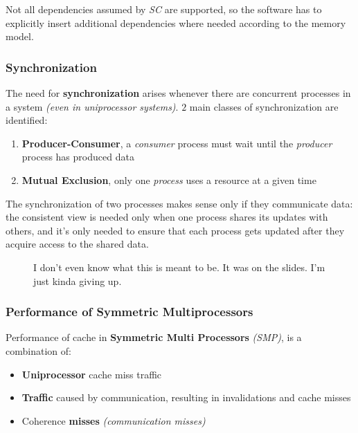 \documentclass[english]{article}
\begin{document}
\bigskip
Not all dependencies assumed by \textit{SC} are supported, so the software has to explicitly insert additional dependencies where needed according to the memory model.

\subsubsection{Synchronization}

The need for \textbf{synchronization} arises whenever there are concurrent processes in a system \textit{(even in uniprocessor systems)}.
\(2\) main classes of synchronization are identified:

\begin{enumerate}
  \item \textbf{Producer-Consumer}, a \textit{consumer} process must wait until the \textit{producer} process has produced data
  \item \textbf{Mutual Exclusion}, only one \textit{process} uses a resource at a given time
\end{enumerate}

\bigskip
The synchronization of two processes makes sense only if they communicate data: the consistent view is needed only when one process shares its updates with others, and it's only needed to ensure that each process gets updated after they acquire access to the shared data.

\begin{figure}[htbp]
  \bigskip
  \centering
  \caption{I don't even know what this is meant to be. It was on the slides. I'm just kinda giving up.}
  \label{fig:i-dont-know}
  \bigskip
\end{figure}

\subsubsection{Performance of Symmetric Multiprocessors}

Performance of cache in \textbf{Symmetric Multi Processors} \textit{(SMP)}, is a combination of:

\begin{itemize}
  \item \textbf{Uniprocessor} cache miss traffic
  \item \textbf{Traffic} caused by communication, resulting in invalidations and cache misses
  \item Coherence \textbf{misses} \textit{(communication misses)}
\end{itemize}
\end{document}
